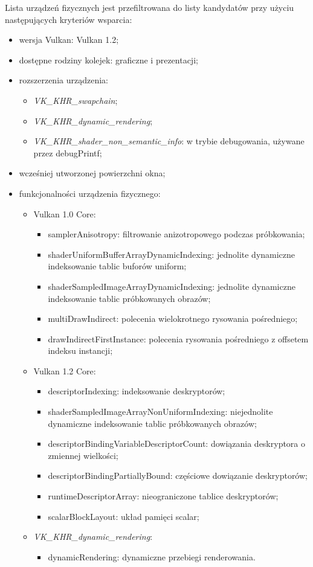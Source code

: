 Lista urządzeń fizycznych jest przefiltrowana do listy kandydatów przy użyciu następujących kryteriów wsparcia:
\begin{itemize}
\item wersja Vulkan: Vulkan 1.2;
\item dostępne rodziny kolejek: graficzne i prezentacji;
\item rozszerzenia urządzenia:
	\begin{itemize}
	\item \textit{VK\_KHR\_swapchain};
	\item \textit{VK\_KHR\_dynamic\_rendering};
	\item \textit{VK\_KHR\_shader\_non\_semantic\_info}: w trybie debugowania, używane przez debugPrintf;
	\end{itemize}
\item wcześniej utworzonej powierzchni okna;
\item funkcjonalności urządzenia fizycznego:
	\begin{itemize}
	\item Vulkan 1.0 Core:
		\begin{itemize}
		\item samplerAnisotropy: filtrowanie anizotropowego podczas próbkowania;
		\item shaderUniformBufferArrayDynamicIndexing: jednolite dynamiczne indeksowanie tablic buforów uniform;
		\item shaderSampledImageArrayDynamicIndexing: jednolite dynamiczne indeksowanie tablic próbkowanych obrazów;
		\item multiDrawIndirect: polecenia wielokrotnego rysowania pośredniego;
		\item drawIndirectFirstInstance: polecenia rysowania pośredniego z offsetem indeksu instancji;
		\end{itemize}
	\item Vulkan 1.2 Core:
		\begin{itemize}
		\item descriptorIndexing: indeksowanie deskryptorów;
		\item shaderSampledImageArrayNonUniformIndexing: niejednolite dynamiczne indeksowanie tablic próbkowanych obrazów;
		\item descriptorBindingVariableDescriptorCount: dowiązania deskryptora o zmiennej wielkości;
		\item descriptorBindingPartiallyBound: częściowe dowiązanie deskryptorów;
		\item runtimeDescriptorArray: nieograniczone tablice deskryptorów;
		\item scalarBlockLayout: układ pamięci scalar;
		\end{itemize}
	\item \textit{VK\_KHR\_dynamic\_rendering}:
	\begin{itemize}
		\item dynamicRendering: dynamiczne przebiegi renderowania.
	\end{itemize}
	\end{itemize}
\end{itemize}
